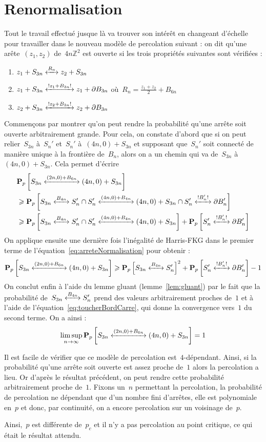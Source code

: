 \section{Renormalisation}\label{sec:renormalisation}

	Tout le travail effectué jusque là va trouver son intérêt en changeant d'échelle pour travailler dans le nouveau modèle de percolation suivant : on dit qu'une arête~$(z_1, z_2)$ de~$4n\mathbb{Z}^2$ est ouverte si les trois propriétés suivantes sont vérifiées :
	\begin{enumerate}[label=(\roman*)]
		\item $\relie[R_n]{z_1 + S_{3n}}{z_2 + S_{3n}}$
		\item $\relie*[z_1 + B_{3n}]{z_1 + S_{3n}}{z_1 + \partial B_{3n}}$ \hfil où~$R_n = \frac{z_1 + z_2}{2} + B_{6n}$
		\item $\relie*[z_2 + B_{3n}]{z_2 + S_{3n}}{z_2 + \partial B_{3n}}$ 
	\end{enumerate}
	Commençons par montrer qu'on peut rendre la probabilité qu'une arrête soit ouverte arbitrairement grande. Pour cela, on constate d'abord que si on peut relier~$S_{3n}$ à~$S_n'$ et~$S_n'$ à~$(4n, 0) + S_{3n}$ et supposant que~$S_n'$ soit connecté de manière unique à la frontière de~$B_n$, alors on a un chemin qui va de~$S_{3n}$ à~$(4n, 0) + S_{3n}$. Cela permet d'écrire
	\begin{align}
		& \Pp{\relie[(2n, 0) + B_{6n}]{S_{3n}}{(4n, 0) + S_{3n}}} \nonumber \\
		& \geq \Pp{ \relie[B_{4n}]{S_{3n}}{S_n'} \cap \relie[(4n, 0) + B_{4n}]{S_n'}{(4n, 0) + S_{3n}} \cap \relie*[B_n']{S_n'}{\partial B_n'} } \nonumber \\
		& \geq \Pp{ \relie[B_{4n}]{S_{3n}}{S_n'} \cap \relie[(4n, 0) + B_{4n}]{S_n'}{(4n, 0) + S_{3n}}} + \Pp{\relie*[B_n']{S_n'}{\partial B_n'}} \label{eq:arreteNormalisation}
	\end{align}
	On applique ensuite une dernière fois l'inégalité de Harris-FKG dans le premier terme de l'équation~\ref{eq:arreteNormalisation} pour obtenir :
	\[
		\Pp{\relie[(2n, 0) + B_{6n}]{S_{3n}}{(4n, 0) + S_{3n}}}	\geq \Pp{ \relie[B_{4n}]{S_{3n}}{S_n'} }^2 + \Pp{\relie*[B_n']{S_n'}{\partial B_n'}}  - 1
	\]
	On conclut enfin à l'aide du lemme gluant (lemme~\ref{lem:gluant}) par le fait que la probabilité de~$\relie[B_{4n}]{S_{3n}}{S_n'}$ prend des valeurs arbitrairement proches de~$1$ et à l'aide de l'équation~\eqref{eq:toucherBordCarre}, qui donne la convergence vers~$1$ du second terme. On a ainsi :
	\[
		\limsup_{n \to \infty} \Pp{\relie[(2n, 0) + B_{6n}]{S_{3n}}{(4n, 0) + S_{3n}}} = 1
	\]

	Il est facile de vérifier que ce modèle de percolation est~$4$-dépendant. Ainsi, si la probabilité qu'une arrête soit ouverte est assez proche de~$1$ alors la percolation a lieu. Or d'après le résultat précédent, on peut rendre cette probabilité arbitrairement proche de~$1$. Fixons un~$n$ permettant la percolation, la probabilité de percolation ne dépendant que d'un nombre fini d'arrêtes, elle est polynomiale en~$p$ et donc, par continuité, on a encore percolation sur un voisinage de~$p$.

	Ainsi,~$p$ est différente de~$p_c$ et il n'y a pas percolation au point critique, ce qui était le résultat attendu.
